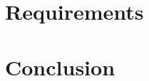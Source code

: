 \documentclass[a4paper,12pt,oneside]{book}
\begin{document}
\chapter{Requirements}

\chapter{Conclusion}





%   
\end{document}
